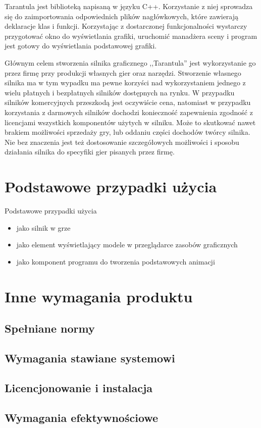 \documentclass[11pt,leqno]{article}
\begin{document}
Tarantula jest biblioteką napisaną w języku C++. Korzystanie z niej sprowadza się do zaimportowania odpowiednich plików nagłówkowych, 
które zawierają deklaracje klas i funkcji. Korzystając z dostarczonej funkcjonalności wystarczy przygotować okno do wyświetlania grafiki, 
uruchomić manadżera sceny i program jest gotowy do wyświetlania podstawowej grafiki.


Głównym celem stworzenia silnika graficznego ,,Tarantula'' jest wykorzystanie go przez firmę przy produkcji własnych gier oraz narzędzi. 
Stworzenie własnego silnika ma w tym wypadku ma pewne korzyści nad wykorzystaniem jednego z wielu płatnych i bezpłatnych silników 
dostępnych na rynku. W przypadku silników komercyjnych przeszkodą jest oczywiście cena, natomiast w przypadku korzystania z darmowych 
silników dochodzi konieczność zapewnienia zgodność z licencjami wszystkich komponentów użytych w silniku. Może to skutkować nawet 
brakiem możliwości sprzedaży gry, lub oddaniu części dochodów twórcy silnika. Nie bez znaczenia jest też dostosowanie szczegółowych 
możliwości i sposobu działania silnika do specyfiki gier pisanych przez firmę.

\section{Podstawowe przypadki użycia}
Podstawowe przypadki użycia
\begin{itemize}
\item jako silnik w grze
\item jako element wyświetlający modele w przeglądarce zasobów graficznych
\item jako komponent programu do tworzenia podstawowych animacji
\end{itemize}

\section{Inne wymagania produktu}

\subsection{Spełniane normy}

\subsection{Wymagania stawiane systemowi}


\subsection{Licencjonowanie i instalacja}

\subsection{Wymagania efektywnościowe}
\end{document}

